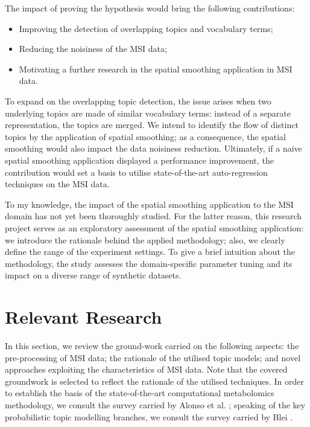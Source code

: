 \documentclass{mpaper}
\begin{document}
\par The impact of proving the hypothesis would bring the following contributions:
\begin{itemize}
	\item Improving the detection of overlapping topics and vocabulary terms;
	\item Reducing the noisiness of the MSI data;
	\item Motivating a further research in the spatial smoothing application in MSI data.
\end{itemize} 
To expand on the overlapping topic detection, the issue arises when two underlying topics are made of similar vocabulary terms: instead of a separate representation, the topics are merged. We intend to identify the flow of distinct topics by the application of spatial smoothing; as a consequence, the spatial smoothing would also impact the data noisiness reduction. Ultimately, if a naive spatial smoothing application displayed a performance improvement, the contribution would set a basis to utilise state-of-the-art auto-regression techniques on the MSI data.

\par To my knowledge, the impact of the spatial smoothing application to the MSI domain has not yet been thoroughly studied. For the latter reason, this research project serves as an exploratory assessment of the spatial smoothing application: we introduce the rationale behind the applied methodology; also, we clearly define the range of the experiment settings. To give a brief intuition about the methodology, the study assesses the domain-specific parameter tuning and its impact on a diverse range of synthetic datasets.

\section{Relevant Research}

\par In this section, we review the ground-work carried on the following aspects: the pre-processing of MSI data; the rationale of the utilised topic models; and novel approaches exploiting the characteristics of MSI data. Note that the covered groundwork is selected to reflect the rationale of the utilised techniques. In order to establish the basis of the state-of-the-art computational metabolomics methodology, we consult the survey carried by Alonso et al. \cite{alonso2015analytical}; speaking of the key probabilistic topic modelling branches, we consult the survey carried by Blei \cite{blei2012probabilistic}. 
\end{document}
